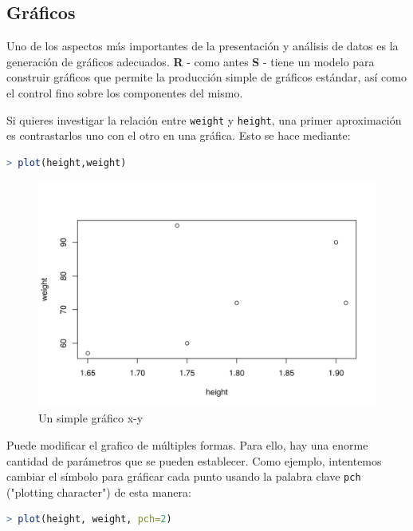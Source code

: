\documentclass[spanish]{extbook}
\numberwithin{equation}{section}
\numberwithin{figure}{section}
\begin{document}
\subsection{Gráficos}

Uno de los aspectos más importantes de la presentación y análisis de datos es
la generación de gráficos adecuados. \textbf{R} - como antes \textbf{S} - tiene
un modelo para construir gráficos que permite la producción simple de gráficos
estándar, así como el control fino sobre los componentes del mismo. 

Si quieres investigar la relación entre  \texttt{weight} y \texttt{height}, una
primer aproximación es contrastarlos uno con el otro en una gráfica. Esto se
hace mediante:

\begin{lstlisting}[language=R]
> plot(height,weight)
\end{lstlisting}

\begin{figure}[H]
  \includegraphics[width=\linewidth]{fig-2.png}
  \caption{Un simple gráfico x-y}
  \label{fig:fig-2}
\end{figure}

Puede modificar el grafico de múltiples formas. Para ello, hay una enorme
cantidad de parámetros que se pueden establecer. Como ejemplo, intentemos
cambiar el símbolo para gráficar cada punto usando la palabra clave
\texttt{pch} ("plotting character") de esta manera:

\begin{lstlisting}[language=R]
> plot(height, weight, pch=2)
\end{lstlisting}
\end{document}
